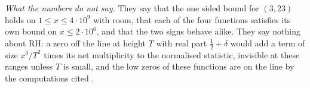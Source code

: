 \emph{What the numbers do not say.}
 They say that the one sided bound for $(3,23)$ holds on $1\le x\le4\cdot10^9$ with room, that each of the four functions satisfies its own bound on $x\le2\cdot10^6$, and that the two signs behave alike. They say nothing about RH: a zero off the line at height $T$ with real part $\frac12+\delta$ would add a term of size $x^\delta/T^2$ times its net multiplicity to the normalised statistic, invisible at these ranges unless $T$ is small, and the low zeros of these functions are on the line by the computations cited \cite{Platt16}.
